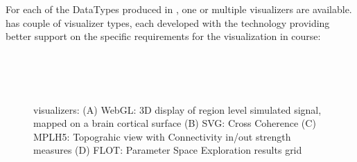For each of the DataTypes produced in \TVB, one or multiple
visualizers are available.   \TVB has couple of  visualizer types,
each developed with the technology providing better support on the
specific requirements for the visualization in course:

 \begin{figure}[!htbp]
    \\
    \\
    \\
    \caption{\TVB visualizers: 
    (A) WebGL: 3D display of region level simulated signal, mapped on a brain cortical surface
    (B) SVG: Cross Coherence
    (C) MPLH5:  Topograhic view with Connectivity in/out strength measures
    (D) FLOT: Parameter Space Exploration results grid}
        \label{fig:viewers}
\end{figure}


